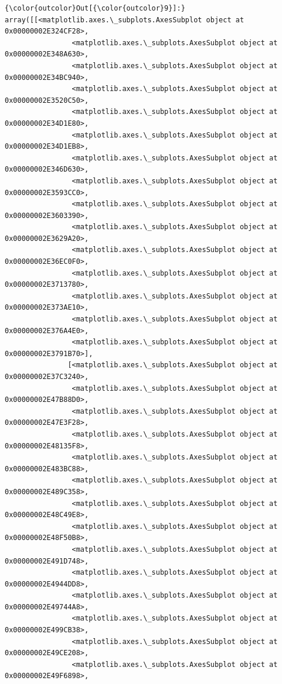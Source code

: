 \documentclass[11pt]{article}
\begin{document}
\begin{Verbatim}[commandchars=\\\{\}]
{\color{outcolor}Out[{\color{outcolor}9}]:} array([[<matplotlib.axes.\_subplots.AxesSubplot object at 0x00000002E324CF28>,
                <matplotlib.axes.\_subplots.AxesSubplot object at 0x00000002E348A630>,
                <matplotlib.axes.\_subplots.AxesSubplot object at 0x00000002E34BC940>,
                <matplotlib.axes.\_subplots.AxesSubplot object at 0x00000002E3520C50>,
                <matplotlib.axes.\_subplots.AxesSubplot object at 0x00000002E34D1E80>,
                <matplotlib.axes.\_subplots.AxesSubplot object at 0x00000002E34D1EB8>,
                <matplotlib.axes.\_subplots.AxesSubplot object at 0x00000002E346D630>,
                <matplotlib.axes.\_subplots.AxesSubplot object at 0x00000002E3593CC0>,
                <matplotlib.axes.\_subplots.AxesSubplot object at 0x00000002E3603390>,
                <matplotlib.axes.\_subplots.AxesSubplot object at 0x00000002E3629A20>,
                <matplotlib.axes.\_subplots.AxesSubplot object at 0x00000002E36EC0F0>,
                <matplotlib.axes.\_subplots.AxesSubplot object at 0x00000002E3713780>,
                <matplotlib.axes.\_subplots.AxesSubplot object at 0x00000002E373AE10>,
                <matplotlib.axes.\_subplots.AxesSubplot object at 0x00000002E376A4E0>,
                <matplotlib.axes.\_subplots.AxesSubplot object at 0x00000002E3791B70>],
               [<matplotlib.axes.\_subplots.AxesSubplot object at 0x00000002E37C3240>,
                <matplotlib.axes.\_subplots.AxesSubplot object at 0x00000002E47B88D0>,
                <matplotlib.axes.\_subplots.AxesSubplot object at 0x00000002E47E3F28>,
                <matplotlib.axes.\_subplots.AxesSubplot object at 0x00000002E48135F8>,
                <matplotlib.axes.\_subplots.AxesSubplot object at 0x00000002E483BC88>,
                <matplotlib.axes.\_subplots.AxesSubplot object at 0x00000002E489C358>,
                <matplotlib.axes.\_subplots.AxesSubplot object at 0x00000002E48C49E8>,
                <matplotlib.axes.\_subplots.AxesSubplot object at 0x00000002E48F50B8>,
                <matplotlib.axes.\_subplots.AxesSubplot object at 0x00000002E491D748>,
                <matplotlib.axes.\_subplots.AxesSubplot object at 0x00000002E4944DD8>,
                <matplotlib.axes.\_subplots.AxesSubplot object at 0x00000002E49744A8>,
                <matplotlib.axes.\_subplots.AxesSubplot object at 0x00000002E499CB38>,
                <matplotlib.axes.\_subplots.AxesSubplot object at 0x00000002E49CE208>,
                <matplotlib.axes.\_subplots.AxesSubplot object at 0x00000002E49F6898>,

\end{Verbatim}
\end{document}
